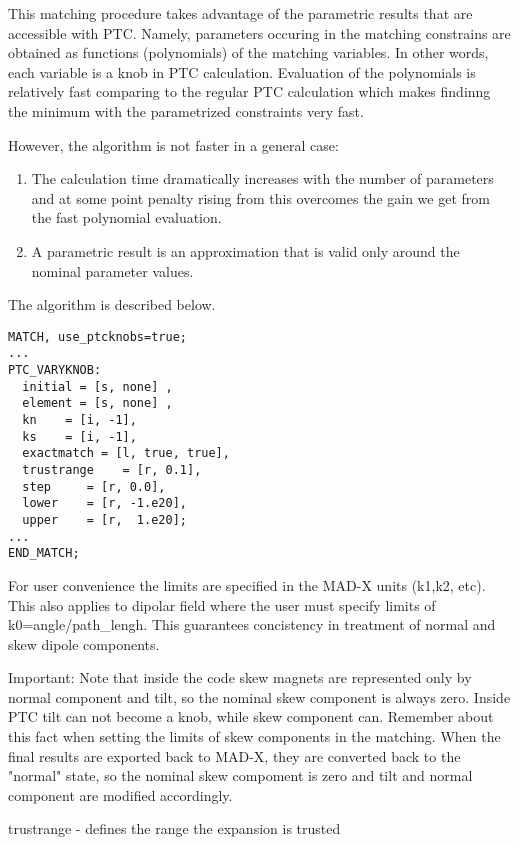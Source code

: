 This matching procedure takes advantage of the parametric results that
are accessible with PTC. Namely, parameters occuring in the matching
constrains are obtained as functions (polynomials) of the matching
variables. In other words, each variable is a knob in PTC
calculation. Evaluation of the polynomials is relatively fast comparing
to the regular PTC calculation which makes findinng the minimum with the
parametrized constraints very fast.  

However, the algorithm is not faster in a general case: 
\begin{enumerate}
   \item  The calculation time dramatically increases with the number of
     parameters and at some point penalty rising from this overcomes the
     gain we get from the fast polynomial evaluation.    
   \item  A parametric result is an approximation that is valid only
     around the nominal parameter values.     
\end{enumerate}

The algorithm is described below. \\
 
\begin{verbatim}
MATCH, use_ptcknobs=true;
...
PTC_VARYKNOB: 
  initial = [s, none] , 
  element = [s, none] , 
  kn    = [i, -1], 
  ks    = [i, -1], 
  exactmatch = [l, true, true], 
  trustrange    = [r, 0.1],  
  step     = [r, 0.0], 
  lower    = [r, -1.e20],
  upper    = [r,  1.e20]; 
...
END_MATCH;
\end{verbatim}

For user convenience the limits are specified in the MAD-X units (k1,k2,
etc). This also applies to dipolar field where the user must specify
limits of k0=angle/path\_lengh. This guarantees concistency in
treatment of normal and skew dipole components.   

Important: Note that inside the code skew magnets are represented only
by  normal component and tilt, so the nominal skew component is always
zero.  Inside PTC tilt can not become a knob, while skew component can.
Remember about this fact when setting the limits of skew components in
the matching.  When the final results are exported back to MAD-X, they
are converted back to the "normal" state, so the nominal skew compoment
is zero and tilt and  normal component are modified accordingly.     

trustrange - defines the range the expansion is trusted \\



